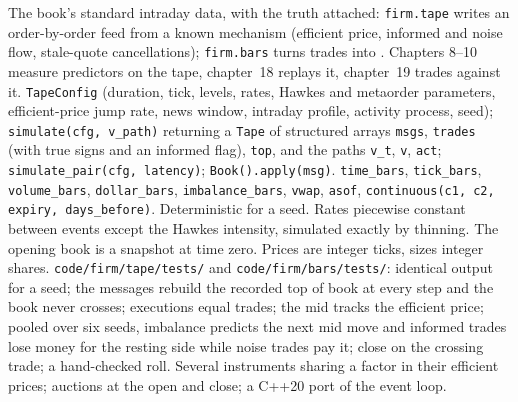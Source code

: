 \begin{build}
 The book's standard intraday data, with the truth attached: \texttt{firm.tape} writes an order-by-order feed
from a known mechanism (efficient price, informed and noise flow, stale-quote cancellations); \texttt{firm.bars} turns trades
into . Chapters 8--10 measure predictors on the tape, chapter~18 replays it, chapter~19 trades against it.
 \texttt{TapeConfig} (duration, tick, levels, rates, Hawkes and metaorder parameters, efficient-price jump
rate, news window, intraday profile, activity process, seed); \texttt{simulate(cfg, v\_path)} returning a \texttt{Tape} of
structured arrays \texttt{msgs}, \texttt{trades} (with true signs and an informed flag), \texttt{top}, and the paths \texttt{v\_t},
\texttt{v}, \texttt{act}; \texttt{simulate\_pair(cfg, latency)}; \texttt{Book().apply(msg)}. \texttt{time\_bars},
\texttt{tick\_bars}, \texttt{volume\_bars}, \texttt{dollar\_bars}, \texttt{imbalance\_bars}, \texttt{vwap}, \texttt{asof},
\texttt{continuous(c1, c2, expiry, days\_before)}.
 Deterministic for a seed. Rates piecewise constant between events except the Hawkes intensity, simulated exactly
by thinning. The opening book is a snapshot at time zero. Prices are integer ticks, sizes integer shares.
 \texttt{code/firm/tape/tests/} and \texttt{code/firm/bars/tests/}: identical output for a seed;
the messages rebuild the recorded top of book at every step and the book never crosses; executions equal trades; the mid tracks
the efficient price; pooled over six seeds, imbalance predicts the next mid move and informed trades lose money for the resting
side while noise trades pay it;  close on the crossing trade; a hand-checked roll.
 Several instruments sharing a factor in their efficient prices; auctions at the open and close; a C++20 port
of the event loop.
\end{build}

